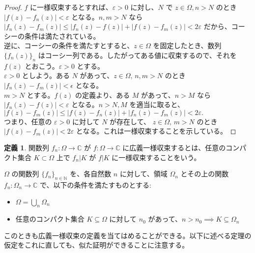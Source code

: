 \documentclass{jsarticle}
\theoremstyle{definition}
\newtheorem*{definition*}{定義}
\begin{document}
    \begin{proof}
        $f$ に一様収束するとすれば、$\varepsilon > 0$ に対し、$N$ で $z \in \Omega, n > N$ のとき $|f(z) - f_n(z)| < \varepsilon$ となる。$n, m > N$ なら $|f_n(z) - f_m(z)| \leq |f_n(z) - f(z)| + |f(z) - f_m(z)| < 2\varepsilon$ だから、コーシーの条件は満たされている。\\
        逆に、コーシーの条件を満たすとすると、$z \in \Omega$ を固定したとき、数列 $\{f_n(z)\}_n$ はコーシー列である。したがってある値に収束するので、それを $f(z)$ とおこう。$\varepsilon > 0$ とする。\\
        $\varepsilon > 0$ としよう。ある $N$ があって、$z \in \Omega, \, n, m > N$ のとき $|f_n(z) - f_m(z)| < \epsilon$ となる。\\
        $m > N$ とする。$f(z)$ の定義より、ある $M$ があって、$n > M$ なら $|f_n(z) - f(z)| < \varepsilon$ となる。$n > N, M$ を適当に取ると、$|f(z) - f_m(z)| \leq |f(z) - f_n(z)| + |f_n(z) - f_m(z)| < 2\varepsilon.$\\
        つまり、任意の $\varepsilon > 0$ に対して $N$ が存在して、 $z \in \Omega, \, m > N$ のとき $|f(z) - f_m(z)| < 2\varepsilon$ となる。これは一様収束することを示している。
    \end{proof}
    \vspace{1ex}
    
    \begin{definition*} 関数列 $f_n : \Omega \rightarrow \mathbb{C}$ が $f : \Omega \rightarrow \mathbb{C}$ に広義一様収束するとは、任意のコンパクト集合 $K \subset \Omega$ 上で $f_n|K$ が $f|K$ に一様収束することをいう。
    \end{definition*}
    
    $\Omega$ の関数列 $\{f_n\}_{n \in \mathbb{N}}$ を、各自然数 $n$ に対して、領域 $\Omega_n$ とその上の関数 $f_n : \Omega_n \rightarrow \mathbb{C}$ で、以下の条件を満たすものとする:
    \begin{itemize}
        \item $\Omega = \bigcup_n \Omega_n$
        \item 任意のコンパクト集合 $K \subseteq \Omega$ に対して $n_0$ があって、$n > n_0 \implies K \subseteq \Omega_n$
    \end{itemize}
    このときも広義一様収束の定義を当てはめることができる。以下に述べる定理の仮定をこれに直しても、似た証明ができることに注意する。
    
\end{document}
